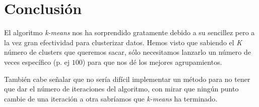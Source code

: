 \documentclass{article}
\begin{document}
\section{Conclusión}
El algoritmo \textit{k-means} nos ha sorprendido gratamente debido a su sencillez pero a la vez gran efectividad para clusterizar datos. Hemos visto que sabiendo el \textit{K} número de clusters que queremos sacar, sólo necesitamos lanzarlo un número de veces específico (p. ej $100$) para que nos dé los mejores agrupamientos.

También cabe señalar que no sería difícil implementar un método para no tener que dar el número de iteraciones del algoritmo, con mirar que ningún punto cambie de una iteración a otra sabríamos que \textit{k-means} ha terminado.
\end{document}
